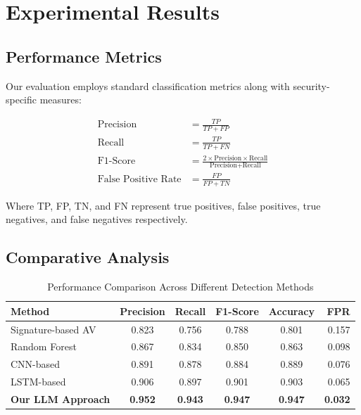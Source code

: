 \documentclass[12pt,a4paper]{article}
\begin{document}
\section{Experimental Results}

\subsection{Performance Metrics}

Our evaluation employs standard classification metrics along with
security-specific measures:

\begin{align}
    \text{Precision}           & = \frac{TP}{TP + FP}                                                                      \\
    \text{Recall}              & = \frac{TP}{TP + FN}                                                                      \\
    \text{F1-Score}            & = \frac{2 \times \text{Precision} \times \text{Recall}}{\text{Precision} + \text{Recall}} \\
    \text{False Positive Rate} & = \frac{FP}{FP + TN}
\end{align}

Where TP, FP, TN, and FN represent true positives, false positives, true
negatives, and false negatives respectively.

\subsection{Comparative Analysis}

\begin{table}[H]
    \centering
    \caption{Performance Comparison Across Different Detection Methods}
    \begin{tabular}{@{}lccccr@{}}
        \toprule
        Method                    & Precision      & Recall         & F1-Score       & Accuracy       & FPR            \\
        \midrule
        Signature-based AV        & 0.823          & 0.756          & 0.788          & 0.801          & 0.157          \\
        Random Forest             & 0.867          & 0.834          & 0.850          & 0.863          & 0.098          \\
        CNN-based                 & 0.891          & 0.878          & 0.884          & 0.889          & 0.076          \\
        LSTM-based                & 0.906          & 0.897          & 0.901          & 0.903          & 0.065          \\
        \textbf{Our LLM Approach} & \textbf{0.952} & \textbf{0.943} & \textbf{0.947} & \textbf{0.947} & \textbf{0.032} \\
        \bottomrule
    \end{tabular}
    \label{tab:results}
\end{table}
\end{document}
